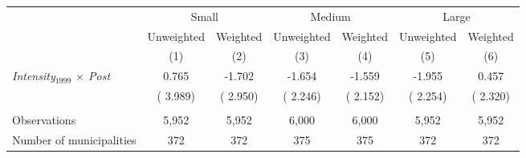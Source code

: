 \begin{tabular}{lcccccc} \hline \hline
& \multicolumn{2}{c}{Small} & \multicolumn{2}{c}{Medium} & \multicolumn{2}{c}{Large} \\ \cmidrule(lr){2-3}\cmidrule(lr){4-5}\cmidrule(lr){6-7}
& \multicolumn{1}{c}{Unweighted} & \multicolumn{1}{c}{Weighted} & \multicolumn{1}{c}{Unweighted} & \multicolumn{1}{c}{Weighted} & \multicolumn{1}{c}{Unweighted} & \multicolumn{1}{c}{Weighted} \\ 
& \multicolumn{1}{c}{(1)} & \multicolumn{1}{c}{(2)} & \multicolumn{1}{c}{(3)} & \multicolumn{1}{c}{(4)} & \multicolumn{1}{c}{(5)} & \multicolumn{1}{c}{(6)} \\ \toprule
\textit{Intensity$_{1999}$ $\times$ Post}&     0.765&    -1.702&    -1.654&    -1.559&    -1.955&     0.457 \\ 
 & (    3.989)& (    2.950)& (    2.246)& (    2.152)& (    2.254)& (    2.320) \\ 
  & & & & & & \\ 
Observations&     5,952&     5,952&     6,000&     6,000&     5,952&     5,952 \\ 
Number of municipalities&       372&       372&       375&       375&       372&       372 \\ 
\bottomrule
\end{tabular}